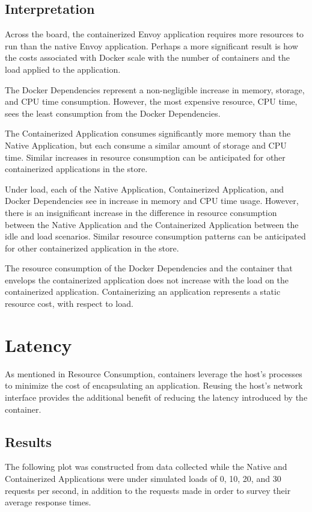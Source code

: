 \documentclass{article}
\begin{document}
\subsection{Interpretation}
Across the board, the containerized Envoy application requires more resources to run than the native Envoy application. Perhaps a more significant result is how the costs associated with Docker scale with the number of containers and the load applied to the application.

The Docker Dependencies represent a non-negligible increase in memory, storage, and CPU time consumption. However, the most expensive resource, CPU time, sees the least consumption from the Docker Dependencies.

The Containerized Application consumes significantly more memory than the Native Application, but each consume a similar amount of storage and CPU time. Similar increases in resource consumption can be anticipated for other containerized applications in the store.

Under load, each of the Native Application, Containerized Application, and Docker Dependencies see in increase in memory and CPU time usage. However, there is an insignificant increase in the difference in resource consumption between the Native Application and the Containerized Application between the idle and load scenarios. Similar resource consumption patterns can be anticipated for other containerized application in the store.

The resource consumption of the Docker Dependencies and the container that envelops the containerized application does not increase with the load on the containerized application. Containerizing an application represents a static resource cost, with respect to load.

\section{Latency}
As mentioned in Resource Consumption, containers leverage the host's processes to minimize the cost of encapsulating an application. Reusing the host's network interface provides the additional benefit of reducing the latency introduced by the container.

\subsection{Results}
The following plot was constructed from data collected while the Native and Containerized Applications were under simulated loads of 0, 10, 20, and 30 requests per second, in addition to the requests made in order to survey their average response times.
\end{document}

